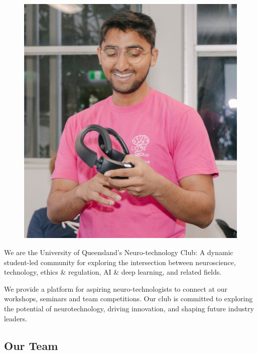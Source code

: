 \documentclass[a4paper,12pt]{report}
\begin{document}
\begin{figure}
\vspace{-15pt}
\includegraphics[width=0.95\linewidth]{./photos/jahan-with-crown-cropped.jpg}
\vspace{-10pt}
\end{figure}

We are the University of Queensland's Neuro-technology Club: A dynamic student-led
community for exploring the intersection between neuroscience, technology, ethics \& regulation,
AI \& deep learning, and related fields. 

We provide a platform for aspiring neuro-technologists to
connect at our workshops, seminars and team competitions. Our club is committed to
exploring the potential of neurotechnology, driving innovation, and shaping future
industry leaders.

\vspace{-1.5cm}

\subsection{Our Team}
\end{document}
